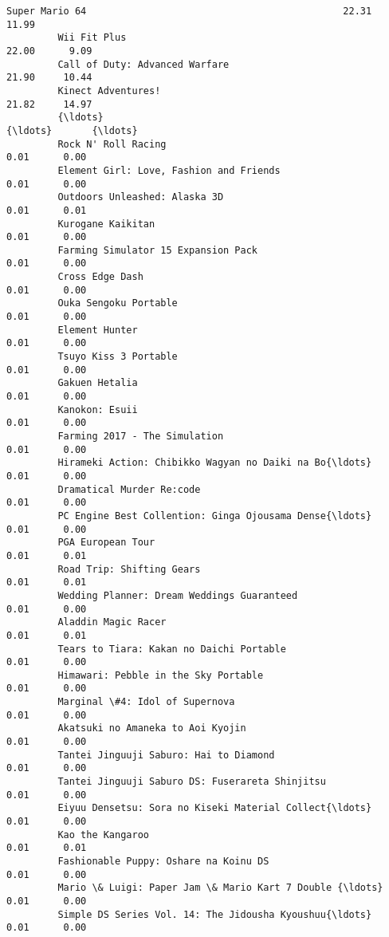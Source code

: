 \documentclass[11pt]{article}
\begin{document}
\begin{Verbatim}[commandchars=\\\{\}]
         Super Mario 64                                             22.31     11.99   
         Wii Fit Plus                                               22.00      9.09   
         Call of Duty: Advanced Warfare                             21.90     10.44   
         Kinect Adventures!                                         21.82     14.97   
         {\ldots}                                                          {\ldots}       {\ldots}   
         Rock N' Roll Racing                                         0.01      0.00   
         Element Girl: Love, Fashion and Friends                     0.01      0.00   
         Outdoors Unleashed: Alaska 3D                               0.01      0.01   
         Kurogane Kaikitan                                           0.01      0.00   
         Farming Simulator 15 Expansion Pack                         0.01      0.00   
         Cross Edge Dash                                             0.01      0.00   
         Ouka Sengoku Portable                                       0.01      0.00   
         Element Hunter                                              0.01      0.00   
         Tsuyo Kiss 3 Portable                                       0.01      0.00   
         Gakuen Hetalia                                              0.01      0.00   
         Kanokon: Esuii                                              0.01      0.00   
         Farming 2017 - The Simulation                               0.01      0.00   
         Hirameki Action: Chibikko Wagyan no Daiki na Bo{\ldots}          0.01      0.00   
         Dramatical Murder Re:code                                   0.01      0.00   
         PC Engine Best Collention: Ginga Ojousama Dense{\ldots}          0.01      0.00   
         PGA European Tour                                           0.01      0.01   
         Road Trip: Shifting Gears                                   0.01      0.01   
         Wedding Planner: Dream Weddings Guaranteed                  0.01      0.00   
         Aladdin Magic Racer                                         0.01      0.01   
         Tears to Tiara: Kakan no Daichi Portable                    0.01      0.00   
         Himawari: Pebble in the Sky Portable                        0.01      0.00   
         Marginal \#4: Idol of Supernova                              0.01      0.00   
         Akatsuki no Amaneka to Aoi Kyojin                           0.01      0.00   
         Tantei Jinguuji Saburo: Hai to Diamond                      0.01      0.00   
         Tantei Jinguuji Saburo DS: Fuserareta Shinjitsu             0.01      0.00   
         Eiyuu Densetsu: Sora no Kiseki Material Collect{\ldots}          0.01      0.00   
         Kao the Kangaroo                                            0.01      0.01   
         Fashionable Puppy: Oshare na Koinu DS                       0.01      0.00   
         Mario \& Luigi: Paper Jam \& Mario Kart 7 Double {\ldots}          0.01      0.00   
         Simple DS Series Vol. 14: The Jidousha Kyoushuu{\ldots}          0.01      0.00   
         

\end{Verbatim}
\end{document}
